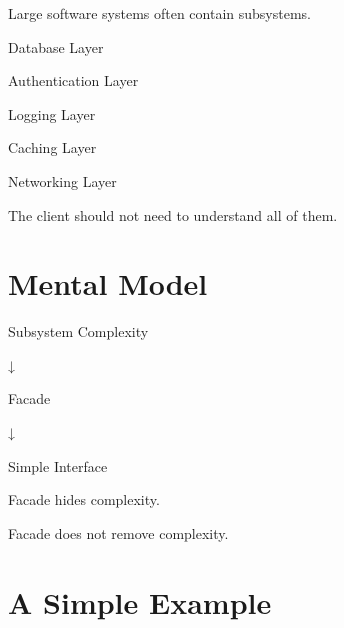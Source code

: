 \documentclass[11pt,a4paper]{book}
\begin{document}
Large software systems often
contain subsystems.


Database Layer


Authentication Layer


Logging Layer


Caching Layer


Networking Layer


The client should not need
to understand all of them.


\section{Mental Model}

\begin{mentalmodel}

Subsystem Complexity

↓

Facade

↓

Simple Interface

Facade hides complexity.


Facade does not remove
complexity.

\end{mentalmodel}


\section{A Simple Example}
\end{document}
